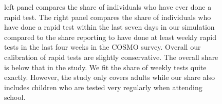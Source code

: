 \begin{figure}[ht]
{    left panel compares the share of individuals who have ever done a rapid test. The right panel compares the share of individuals who have done a rapid test within the last seven days in our simulation compared to the share reporting to have done at least weekly rapid tests in the last four weeks in the COSMO survey. Overall our calibration of rapid tests are slightly conservative. The overall share is below that in the study. We fit the share of weekly tests quite exactly. However, the study only covers adults while our share also includes children who are tested very regularly when attending school.
    }
\end{figure}
